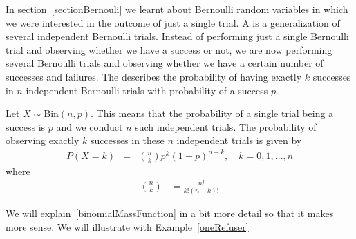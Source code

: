 

In section~\ref{sectionBernouli} we learnt about Bernoulli random variables
in which we were interested in the outcome of just a single trial.
A  is a generalization of several independent Bernoulli trials.
Instead of performing just a single Bernoulli trial and observing whether we have a success or not,
we are now performing several Bernoulli trials and observing whether we have a certain number of 
successes and failures.
The  describes the probability of having exactly $k$ successes in $n$ independent Bernoulli trials with probability of a success $p$.




\begin{termBox}{ 
Let $X \sim \text{Bin}(n, p)$.
This means that the probability of a single trial being a success is $p$ and we conduct $n$ such independent trials. 
The probability of observing exactly $k$ successes in these $n$ independent trials is given by %
\begin{eqnarray}
P(X = k) &=& \displaystyle{n\choose k}p^k(1-p)^{n-k},	\quad k = 0, 1, \ldots, n \label{binomialMassFunction}
\end{eqnarray}
where
\begin{align}
{n \choose k}	& = \frac{n!}{k! (n-k)!}
\end{align}
}
\end{termBox}









We will explain~\ref{binomialMassFunction} in a bit more detail so that it makes more sense.
We will illustrate with Example~\ref{oneRefuser}

